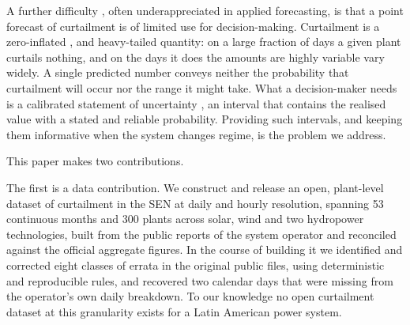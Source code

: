 \documentclass[preprint,3p,times]{elsarticle}
\providecommand{\DIFaddtex}[1]{{\protect\color{blue} \sf #1}} %
\providecommand{\DIFdeltex}[1]{{\protect\color{red} \scriptsize #1}} %
\providecommand{\DIFaddbegin}{} %
\providecommand{\DIFaddend}{} %
\providecommand{\DIFdelbegin}{} %
\providecommand{\DIFdelend}{} %
\providecommand{\DIFadd}[1]{\texorpdfstring{\DIFaddtex{#1}}{#1}} %
\providecommand{\DIFdel}[1]{\texorpdfstring{\DIFdeltex{#1}}{}} %
\begin{document}
A further difficulty \DIFdelbegin \DIFdel{, often underappreciated in applied forecasting, }\DIFdelend is that a point forecast of curtailment is of limited use for decision-making. Curtailment is \DIFdelbegin \DIFdel{a }\DIFdelend zero-inflated \DIFdelbegin \DIFdel{, }\DIFdelend \DIFaddbegin \DIFadd{and }\DIFaddend heavy-tailed\DIFdelbegin \DIFdel{quantity}\DIFdelend : on a large fraction of days a given plant curtails nothing, and on the days it does the amounts \DIFdelbegin \DIFdel{are highly variable}\DIFdelend \DIFaddbegin \DIFadd{vary widely}\DIFaddend . A single predicted number conveys neither the probability that curtailment will occur nor the range it might take. What a decision-maker needs is a calibrated statement of uncertainty\DIFdelbegin \DIFdel{, an interval that contains the realised value with a stated and reliable probability}\DIFdelend . Providing such intervals, and keeping them informative when the system changes regime, is the problem we address.

This paper makes two contributions.
\DIFaddbegin 

\DIFaddend The first is a data contribution. We construct and release an open, plant-level dataset of curtailment in the SEN at daily and hourly resolution, spanning 53 continuous months and 300 plants across solar, wind and two hydropower technologies, built from the public reports of the system operator and reconciled against the official aggregate figures. In the course of building it we identified and corrected eight classes of errata in the original public files, using deterministic and reproducible rules, and recovered two calendar days \DIFdelbegin \DIFdel{that were }\DIFdelend missing from the operator's own daily breakdown. To our knowledge no open curtailment dataset at this granularity exists for a Latin American power system.
\DIFaddbegin 
\end{document}
